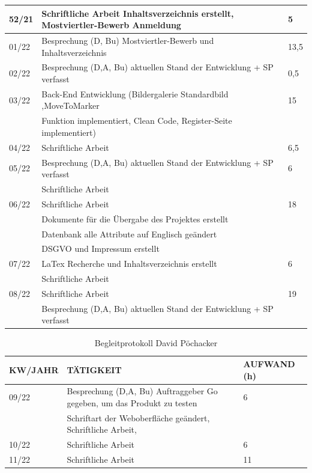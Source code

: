 \begin{table}[h]
\begin{tabular}{|l|l|l|}
52/21   & Schriftliche Arbeit Inhaltsverzeichnis erstellt, Mostviertler-Bewerb Anmeldung& 5 \\ \hline			
01/22   & Besprechung (D, Bu) Mostviertler-Bewerb und Inhaltsverzeichnis & 13,5 \\ \hline		
02/22   & Besprechung (D,A, Bu) aktuellen Stand der Entwicklung + SP verfasst & 0,5 \\ \hline	
03/22   & Back-End Entwicklung (Bildergalerie Standardbild ,MoveToMarker  & 15 \\ 
& Funktion implementiert, Clean Code, Register-Seite implementiert) & \\ \hline	
04/22   & Schriftliche Arbeit & 6,5 \\ \hline		
05/22   & Besprechung (D,A, Bu) aktuellen Stand der Entwicklung + SP verfasst  & 6 \\ 
& Schriftliche Arbeit & \\ \hline		
06/22   & Schriftliche Arbeit & 18 \\
& Dokumente für die Übergabe des Projektes erstellt &  \\ 
& Datenbank alle Attribute auf Englisch geändert  & \\ 
& DSGVO und Impressum erstellt  & \\ \hline	
07/22   & LaTex Recherche und Inhaltsverzeichnis erstellt  & 6 \\ 
& Schriftliche Arbeit & \\ \hline	
08/22   & Schriftliche Arbeit  & 19 \\ 
& Besprechung (D,A, Bu) aktuellen Stand der Entwicklung + SP verfasst  & \\ \hline
		
	\end{tabular}
\end{table}

\newpage
\begin{table}[h]
	\begin{tabular}{|l|l|l|}
		\hline
		\textbf{KW/JAHR} &     \textbf{TÄTIGKEIT}  & 	\textbf{AUFWAND (h)}    \\ \hline
		
09/22   & Besprechung (D,A, Bu) Auftraggeber Go gegeben, um das Produkt zu testen   & 6 \\ 
		& Schriftart der Weboberfläche geändert, Schriftliche Arbeit, & \\ \hline		
10/22   & Schriftliche Arbeit & 6 \\ \hline
11/22   & Schriftliche Arbeit & 11 \\ \hline	
		

	\end{tabular}
	\caption{Begleitprotokoll David Pöchacker}
	\label{tab:Begleitprotokoll David Pöchacker}
\end{table}








